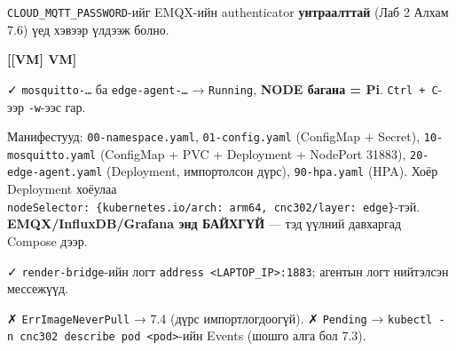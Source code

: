 \texttt{CLOUD\_\allowbreak{}MQTT\_\allowbreak{}PASSWORD}-ийг EMQX-ийн authenticator \textbf{унтраалттай} (Лаб 2 Алхам 7.6) үед хэвээр үлдээж болно.

\textbf{{[}{[}VM{]} VM{]}}

\begin{Shaded}
\begin{Highlighting}[]
\KeywordTok{\&\&} \KeywordTok{\&\&} 
\end{Highlighting}
\end{Shaded}

✓ \texttt{mosquitto-\ldots{}} ба \texttt{edge-agent-\ldots{}} → \texttt{Running}, \textbf{NODE багана = Pi}. \texttt{Ctrl\ +\ C}-ээр \texttt{-w}-ээс гар.

Манифестууд: \texttt{00-namespace.\allowbreak{}yaml}, \texttt{01-config.yaml} (ConfigMap + Secret), \texttt{10-mosquitto.\allowbreak{}yaml} (ConfigMap + PVC + Deployment + NodePort 31883), \texttt{20-edge-agent.\allowbreak{}yaml} (Deployment, импортолсон дүрс), \texttt{90-hpa.yaml} (HPA). Хоёр Deployment хоёулаа \texttt{nodeSelector:\allowbreak{}\ \{kubernetes.\allowbreak{}io/\allowbreak{}arch:\allowbreak{}\ arm64,\ cnc302/\allowbreak{}layer:\allowbreak{}\ edge\}}-тэй. \textbf{EMQX/InfluxDB/Grafana энд БАЙХГҮЙ} --- тэд үүлний давхаргад Compose дээр.

\begin{Shaded}
\begin{Highlighting}[]
\end{Highlighting}
\end{Shaded}

✓ \texttt{render-bridge}-ийн логт \texttt{address\ \textless{}LAPTOP\_\allowbreak{}IP\textgreater{}:\allowbreak{}1883}; агентын логт нийтэлсэн мессежүүд.

✗ \texttt{ErrImageNeverPull} → 7.4 (дүрс импортлогдоогүй). ✗ \texttt{Pending} → \texttt{kubectl\ -n\ cnc302\ describe\ pod\ \textless{}pod\textgreater{}}-ийн Events (шошго алга бол 7.3).


